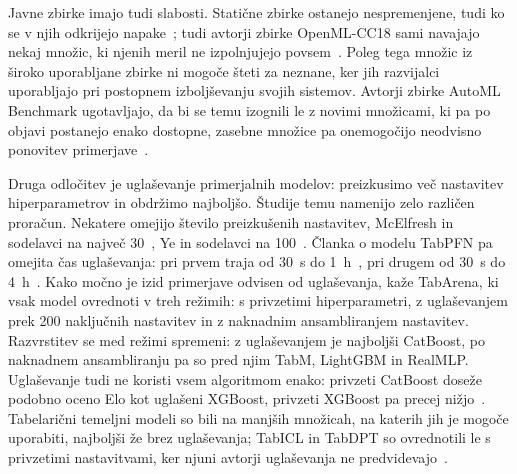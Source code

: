 \documentclass[a4paper,12pt,openright]{book}
\begin{document}
Javne zbirke imajo tudi slabosti. Statične zbirke ostanejo nespremenjene, tudi
ko se v njih odkrijejo napake~\cite{erickson2025tabarena}; tudi avtorji zbirke
OpenML-CC18 sami navajajo nekaj množic, ki njenih meril ne izpolnjujejo
povsem~\cite{bischl2021openml}. Poleg tega množic iz široko uporabljane zbirke
ni mogoče šteti za neznane, ker jih razvijalci uporabljajo pri postopnem
izboljševanju svojih sistemov. Avtorji zbirke AutoML Benchmark ugotavljajo, da
bi se temu izognili le z novimi množicami, ki pa po objavi postanejo enako
dostopne, zasebne množice pa onemogočijo neodvisno ponovitev
primerjave~\cite{gijsbers2024amlb}.

Druga odločitev je uglaševanje primerjalnih modelov: preizkusimo več nastavitev
hiperparametrov in obdržimo najboljšo. Študije temu namenijo zelo različen
proračun. Nekatere omejijo število preizkušenih nastavitev, McElfresh in
sodelavci na največ 30~\cite{mcelfresh2023neural}, Ye in sodelavci na
100~\cite{ye2024closer}. Članka o modelu TabPFN pa omejita čas uglaševanja: pri
prvem traja od 30~s do 1~h~\cite{hollmann2023tabpfn}, pri drugem od 30~s do
4~h~\cite{hollmann2025tabpfn}. Kako močno je izid primerjave odvisen od uglaševanja, kaže TabArena, ki vsak
model ovrednoti v treh režimih: s privzetimi hiperparametri, z uglaševanjem prek
200 naključnih nastavitev in z naknadnim ansambliranjem nastavitev. Razvrstitev
se med režimi spremeni: z uglaševanjem je najboljši CatBoost, po naknadnem
ansambliranju pa so pred njim TabM, LightGBM in RealMLP. Uglaševanje tudi ne
koristi vsem algoritmom enako: privzeti CatBoost doseže podobno oceno Elo kot
uglašeni XGBoost, privzeti XGBoost pa precej nižjo~\cite{erickson2025tabarena}.
Tabelarični temeljni modeli so bili na manjših množicah, na katerih jih je
mogoče uporabiti, najboljši že brez uglaševanja; TabICL in TabDPT so
ovrednotili le s privzetimi nastavitvami, ker njuni avtorji uglaševanja ne
predvidevajo~\cite{erickson2025tabarena}.
\end{document}
